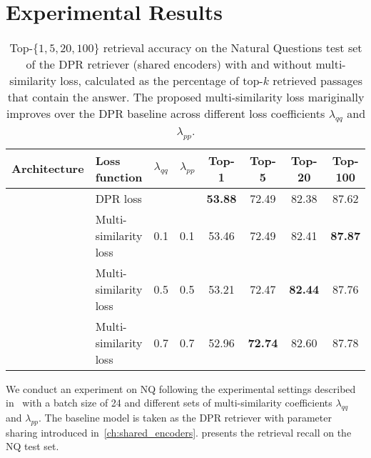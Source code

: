 \section{Experimental Results}
\label{sec:multi_similarity_results}


\begin{table*}[t!]
	\setlength\tabcolsep{5pt}
	\centering
	\small
	\begin{tabular}{llll|cccc}
		\toprule
		\textbf{Architecture} & \textbf{Loss function} & \textbf{$\lambda_{qq}$} & \textbf{$\lambda_{pp}$}
		& Top-1 & Top-5 & Top-20 & Top-100 \\ 
		\midrule
		 & DPR loss & &
		& \textbf{53.88} & 72.49 & 82.38 & 87.62 \\
		& Multi-similarity loss & 0.1 & 0.1
		& 53.46 & 72.49 & 82.41 & \textbf{87.87} \\
		& Multi-similarity loss & 0.5 & 0.5
		& 53.21 & 72.47 & \textbf{82.44} & 87.76 \\
		& Multi-similarity loss & 0.7 & 0.7
		& 52.96 & \textbf{72.74} & 82.60 & 87.78 \\
		\bottomrule
	\end{tabular}
	\caption[Top-$\{1, 5, 20, 100\}$ retrieval accuracy on the Natural Questions test set of the DPR retriever (shared encoders) with and without multi-similarity loss.]{
		Top-$\{1, 5, 20, 100\}$ retrieval accuracy on the Natural Questions test set of the DPR retriever (shared encoders) with and without multi-similarity loss, calculated as the percentage of top-$k$ retrieved passages that contain the answer.
		The proposed multi-similarity loss mariginally improves over the DPR baseline across different loss coefficients  $\lambda_{qq}$ and $\lambda_{pp}$.
	}
	
	\label{tab:multi_similarity_results}
\end{table*}


%
We conduct an experiment on NQ following the experimental settings described in~ with a batch size of 24 and different sets of multi-similarity coefficients $\lambda_{qq}$ and $\lambda_{pp}$.
%
The baseline model is taken as the DPR retriever with parameter sharing introduced in~\cref{ch:shared_encoders}.
%
 presents the retrieval recall on the NQ test set.

